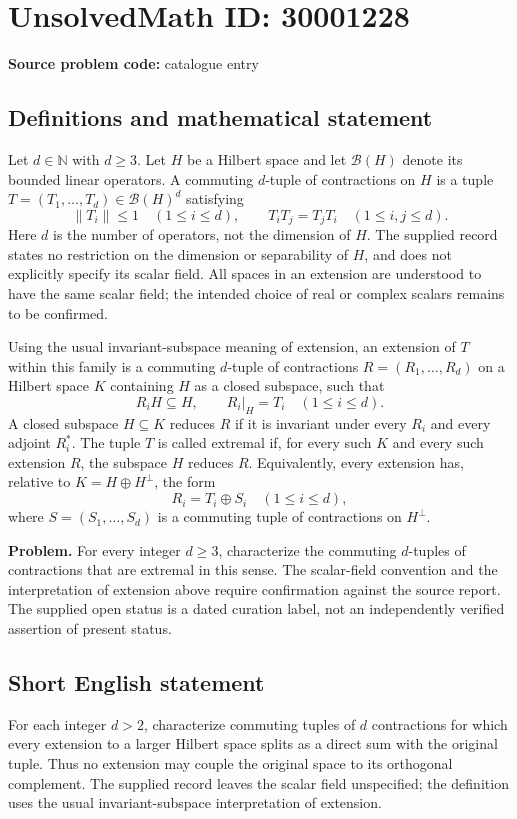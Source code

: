 \documentclass[11pt]{article}
\newcommand{\N}{\mathbb{N}}
\begin{document}
\section*{UnsolvedMath ID: 30001228}
\textbf{Source problem code:} catalogue entry
\subsection{Definitions and mathematical statement}
Let \(d\in\N\) with \(d\geq 3\). Let \(H\) be a Hilbert space and let \(\mathcal B(H)\) denote its bounded linear operators. A commuting \(d\)-tuple of contractions on \(H\) is a tuple \(T=(T_1,\ldots,T_d)\in\mathcal B(H)^d\) satisfying
\[
\|T_i\|\leq 1\quad(1\leq i\leq d),\qquad T_iT_j=T_jT_i\quad(1\leq i,j\leq d).
\]
Here \(d\) is the number of operators, not the dimension of \(H\). The supplied record states no restriction on the dimension or separability of \(H\), and does not explicitly specify its scalar field. All spaces in an extension are understood to have the same scalar field; the intended choice of real or complex scalars remains to be confirmed.

Using the usual invariant-subspace meaning of extension, an extension of \(T\) within this family is a commuting \(d\)-tuple of contractions \(R=(R_1,\ldots,R_d)\) on a Hilbert space \(K\) containing \(H\) as a closed subspace, such that
\[
R_iH\subseteq H,\qquad R_i|_H=T_i\quad(1\leq i\leq d).
\]
A closed subspace \(H\subseteq K\) reduces \(R\) if it is invariant under every \(R_i\) and every adjoint \(R_i^*\). The tuple \(T\) is called extremal if, for every such \(K\) and every such extension \(R\), the subspace \(H\) reduces \(R\). Equivalently, every extension has, relative to \(K=H\oplus H^\perp\), the form
\[
R_i=T_i\oplus S_i\quad(1\leq i\leq d),
\]
where \(S=(S_1,\ldots,S_d)\) is a commuting tuple of contractions on \(H^\perp\).

\textbf{Problem.} For every integer \(d\geq 3\), characterize the commuting \(d\)-tuples of contractions that are extremal in this sense. The scalar-field convention and the interpretation of extension above require confirmation against the source report. The supplied open status is a dated curation label, not an independently verified assertion of present status.
\subsection{Short English statement}
For each integer \(d>2\), characterize commuting tuples of \(d\) contractions for which every extension to a larger Hilbert space splits as a direct sum with the original tuple. Thus no extension may couple the original space to its orthogonal complement. The supplied record leaves the scalar field unspecified; the definition uses the usual invariant-subspace interpretation of extension.
\end{document}
